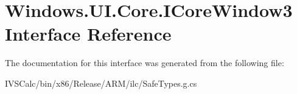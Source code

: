 \hypertarget{interface_windows_1_1_u_i_1_1_core_1_1_i_core_window3}{}\section{Windows.\+U\+I.\+Core.\+I\+Core\+Window3 Interface Reference}
\label{interface_windows_1_1_u_i_1_1_core_1_1_i_core_window3}


The documentation for this interface was generated from the following file\+:\begin{DoxyCompactItemize}
\item 
I\+V\+S\+Calc/bin/x86/\+Release/\+A\+R\+M/ilc/Safe\+Types.\+g.\+cs\end{DoxyCompactItemize}
